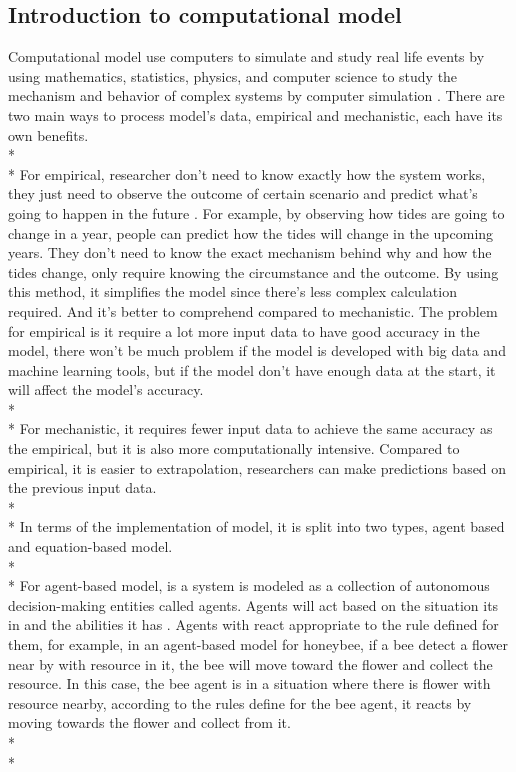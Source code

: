 \subsection{Introduction to computational model}
Computational model use computers to simulate and study real life events by using mathematics, statistics, physics, and computer science to study the mechanism and behavior of complex systems by computer simulation \cite{Reference1}. There are two main ways to process model’s data, empirical and mechanistic, each have its own benefits. \\*\\*
For empirical, researcher don’t need to know exactly how the system works, they just need to observe the outcome of certain scenario and predict what’s going to happen in the future \cite{Reference5}. For example, by observing how tides are going to change in a year, people can predict how the tides will change in the upcoming years. They don’t need to know the exact mechanism behind why and how the tides change, only require knowing the circumstance and the outcome. By using this method, it simplifies the model since there’s less complex calculation required. And it’s better to comprehend compared to mechanistic. The problem for empirical is it require a lot more input data to have good accuracy in the model, there won’t be much problem if the model is developed with big data and machine learning tools, but if the model don’t have enough data at the start, it will affect the model’s accuracy. \\*\\*
For mechanistic, it requires fewer input data to achieve the same accuracy as the empirical, but it is also more computationally intensive. Compared to empirical, it is easier to extrapolation, researchers can make predictions based on the previous input data. \\*\\*
In terms of the implementation of model, it is split into two types, agent based and equation-based model. \\*\\* 
For agent-based model, is a system is modeled as a collection of autonomous decision-making entities called agents. Agents will act based on the situation its in and the abilities it has \cite{Reference6}. Agents with react appropriate to the rule defined for them, for example, in an agent-based model for honeybee, if a bee detect a flower near by with resource in it, the bee will move toward the flower and collect the resource. In this case, the bee agent is in a situation where there is flower with resource nearby, according to the rules define for the bee agent, it reacts by moving towards the flower and collect from it. \\*\\*
